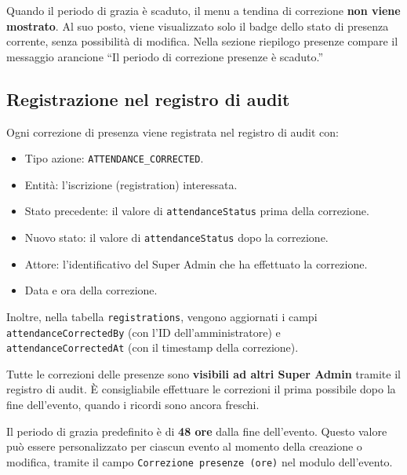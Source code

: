 \documentclass[a4paper,11pt,oneside]{book}
\newcommand{\campo}[1]{\texttt{#1}}
\begin{document}
Quando il periodo di grazia \`e scaduto, il menu a tendina di correzione \textbf{non viene mostrato}. Al suo posto, viene visualizzato solo il badge dello stato di presenza corrente, senza possibilit\`a di modifica. Nella sezione riepilogo presenze compare il messaggio arancione ``Il periodo di correzione presenze \`e scaduto.''

\subsection{Registrazione nel registro di audit}

Ogni correzione di presenza viene registrata nel registro di audit con:

\begin{itemize}[leftmargin=1.5em]
  \item Tipo azione: \texttt{ATTENDANCE\_CORRECTED}.
  \item Entit\`a: l'iscrizione (registration) interessata.
  \item Stato precedente: il valore di \campo{attendanceStatus} prima della correzione.
  \item Nuovo stato: il valore di \campo{attendanceStatus} dopo la correzione.
  \item Attore: l'identificativo del Super Admin che ha effettuato la correzione.
  \item Data e ora della correzione.
\end{itemize}

Inoltre, nella tabella \texttt{registrations}, vengono aggiornati i campi \campo{attendanceCorrectedBy} (con l'ID dell'amministratore) e \campo{attendanceCorrectedAt} (con il timestamp della correzione).

\begin{warningbox}
Tutte le correzioni delle presenze sono \textbf{visibili ad altri Super Admin} tramite il registro di audit. \`E consigliabile effettuare le correzioni il prima possibile dopo la fine dell'evento, quando i ricordi sono ancora freschi.
\end{warningbox}

\begin{infobox}
Il periodo di grazia predefinito \`e di \textbf{48 ore} dalla fine dell'evento. Questo valore pu\`o essere personalizzato per ciascun evento al momento della creazione o modifica, tramite il campo \campo{Correzione presenze (ore)} nel modulo dell'evento.
\end{infobox}
\end{document}
